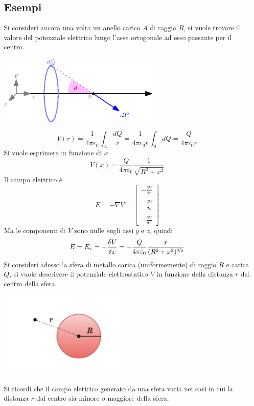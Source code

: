 \documentclass[10pt, letterpaper]{report}
\begin{document}
\subsection{Esempi}
Si consideri ancora una volta un anello carico $A$ di raggio $R$, si vuole trovare il valore del potenziale elettrico lungo l'asse ortogonale ad esso passante per il centro.
\begin{center}
    \includegraphics[width=0.6\textwidth]{images/anello1.eps}
\end{center}
$$ V(r)=\frac{1}{4\pi\varepsilon_0}\int_A \frac{dQ}{r}=\frac{1}{4\pi\varepsilon_0r}\int_A dQ=\frac{Q}{4\pi\varepsilon_0r}$$
Si vuole esprimere in funzione di $x$
$$ V(x)=\frac{Q}{4\pi\varepsilon_0}\frac{1}{\sqrt{R^2+x^2}}$$
Il campo elettrico è 
$$ \bar E = -\nabla V = \begin{bmatrix}
    -\frac{\delta V}{\delta x}\\\\
    -\frac{\delta V}{\delta y}\\\\
   -\frac{\delta V}{\delta z}
\end{bmatrix}$$
Ma le componenti di $V$ sono nulle sugli assi $y$ e $z$, quindi 
$$ \bar E = E_x=-\frac{\delta V}{\delta x}=-\frac{Q}{4\pi\varepsilon_0} \frac{x}{(R^2+x^2)^{\nicefrac{3}{2}}} $$
Si consideri adesso la sfera di metallo carica (uniformemente) di raggio $R$ e carica $Q$, si vuole descrivere il potenziale elettrostatico $V$ in funzione della distanza $r$ dal centro della sfera.\begin{center}
    \includegraphics[width=0.5\textwidth]{images/sferaCarica2.pdf}
\end{center}
Si ricordi che il campo elettrico generato da una sfera varia nei casi in cui la distanza $r$ dal centro sia minore o maggiore della sfera. 
\end{document}
